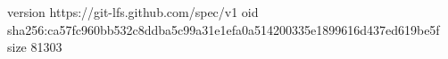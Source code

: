 version https://git-lfs.github.com/spec/v1
oid sha256:ca57fc960bb532c8ddba5c99a31e1efa0a514200335e1899616d437ed619be5f
size 81303
